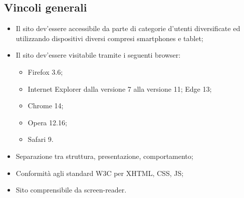 {	\subsection{Vincoli generali}{
		\begin{itemize}\itemsep1pt
			\item Il sito dev'essere accessibile da parte di categorie d'utenti diversificate ed utilizzando dispositivi diversi compresi smartphones e tablet;
			\item Il sito dev'essere visitabile tramite i seguenti browser: 
				\begin{itemize}
					\item Firefox 3.6;
					\item Internet Explorer dalla versione 7 alla versione 11; Edge 13;
					\item Chrome 14;
					\item Opera 12.16;
					\item Safari 9.
				\end{itemize}
			\item Separazione tra struttura, presentazione, comportamento;
			\item Conformità agli standard W3C per XHTML, CSS, JS;
			\item Sito comprensibile da screen-reader.
		\end{itemize}
	}
}
